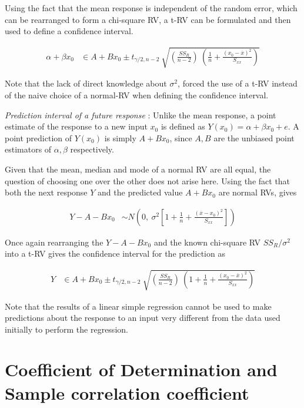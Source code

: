 Using the fact that the mean response is independent of the random error, which can be rearranged to form a chi-square RV, a t-RV can be formulated and then used to define a confidence interval.

\begin{align}
	\alpha + \beta x_0 &\in A + B x_0 \pm t_{\gamma/2, n-2}\ \sqrt{\left(\frac{SS_R}{n-2}\right)\ \left( \frac{1}{n} + \frac{(x_0  - \overline{x})^2}{S_{xx}}\right)}
\end{align}

Note that the lack of direct knowledge about $ \sigma^2 $, forced the use of a t-RV instead of the naive choice of a normal-RV when defining the confidence interval.

\textit{Prediction interval of a future response} : Unlike the mean response, a point estimate of the response to a new input $ x_0 $ is defined as $ Y(x_0)  = \alpha + \beta x_0 + e$. A point prediction of $ Y(x_0) $ is simply $ A + B x_0 $, since $ A, B $ are the unbiased point estimators of $ \alpha, \beta $ respectively.

Given that the mean, median and mode of a normal RV are all equal, the question of choosing one over the other does not arise here. Using the fact that both the next response $ Y $ and the predicted value $ A + B x_0 $ are normal RVs, gives

\begin{align}
	Y - A - B x_0 &\sim N\left( 0,\ \sigma^2 \left[1 + \frac{1}{n} + \frac{(\overline{x} - x_0)^2}{S_{xx}} \right]\right)
\end{align}

Once again rearranging the $ Y - A - B x_0 $ and the known chi-square RV $ SS_R / \sigma^2 $ into a t-RV gives the confidence interval for the prediction as

\begin{align}
	Y &\in A + B x_0 \pm t_{\gamma/2, n-2}\ \sqrt{\left(\frac{SS_R}{n-2}\right)\ \left( 1 + \frac{1}{n} + \frac{(x_0  - \overline{x})^2}{S_{xx}}\right)}
\end{align}

Note that the results of a linear simple regression cannot be used to make predictions about the response to an input very different from the data used initially to perform the regression.

\section{Coefficient of Determination and Sample correlation coefficient}

